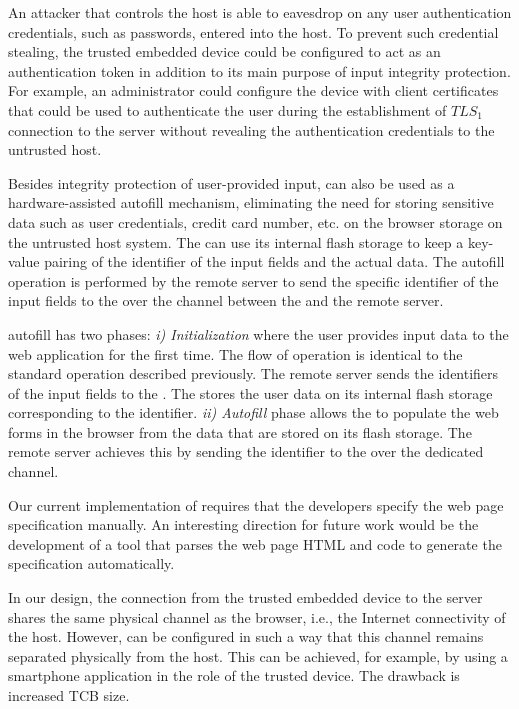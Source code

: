  An attacker that controls the host is able to eavesdrop on any user authentication credentials, such as passwords, entered into the host. To prevent such credential stealing, the trusted embedded device could be configured to act as an authentication token in addition to its main purpose of input integrity protection. For example, an administrator could configure the device with client certificates that could be used to authenticate the user during the establishment of $TLS_1$ connection to the server without revealing the authentication credentials to the untrusted host.

 Besides integrity protection of user-provided input, \device can also be used as a hardware-assisted autofill mechanism, eliminating the need for storing sensitive data such as user credentials, credit card number, etc. on the browser storage on the untrusted host system. The \device can use its internal flash storage to keep a key-value pairing of the identifier of the input fields and the actual data. The autofill operation is performed by the remote server to send the specific identifier of the input fields to the \device over the \tls channel between the \device and the remote server. 

\name autofill has two phases: 
\emph{i) Initialization} where the user provides input data to the web application for the first time. The flow of operation is identical to the standard \name operation described previously. The remote server sends the identifiers of the input fields to the \device. The \device stores the user data on its internal flash storage corresponding to the identifier. \emph{ii) Autofill} phase allows the \device to populate the web forms in the browser from the data that are stored on its flash storage. The remote server achieves this by sending the identifier to the \device over the dedicated \tls channel.

 Our current implementation of \tool requires that the developers specify the web page specification manually. An interesting direction for future work would be the development of a tool that parses the web page HTML and \js code to generate the specification automatically. 

 In our design, the connection from the trusted embedded device to the server shares the same physical channel as the browser, i.e., the Internet connectivity of the host. However, \tool can be configured in such a way that this channel remains separated physically from the host. This can be achieved, for example, by using a smartphone application in the role of the trusted device. The drawback is increased TCB size.

